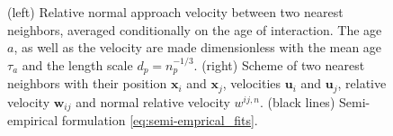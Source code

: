 \begin{figure}[h!]
    \centering
    \caption{(left) Relative normal approach velocity between two nearest neighbors, averaged conditionally on the age of interaction.  
    The age $a$, as well as the velocity are made dimensionless  with the mean age $\tau_a$ and the length scale $d_p = n_p^{-1/3}$. 
    (right)
    Scheme of two nearest neighbors with their position $\textbf{x}_i$ and $\textbf{x}_j$, velocities $\textbf{u}_{i}$ and $\textbf{u}_j$, relative velocity $\textbf{w}_{ij}$ and normal relative velocity $w^{ij,n}$. 
    (black lines) Semi-empirical formulation \eqref{eq:semi-emprical_fits}.
    }
    \label{fig:normal_vel_picture}
\end{figure}
